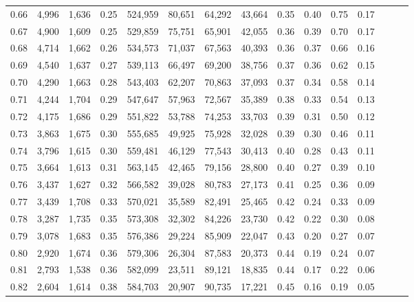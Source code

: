 \begin{tabular}{rrrrrrrrrrrrrrr}
0.66 &   4,996 &  1,636 &  0.25 &  524,959 &   80,651 &   64,292 &   43,664 &  0.35 &  0.40 &  0.75 &      0.17 \\
0.67 &   4,900 &  1,609 &  0.25 &  529,859 &   75,751 &   65,901 &   42,055 &  0.36 &  0.39 &  0.70 &      0.17 \\
0.68 &   4,714 &  1,662 &  0.26 &  534,573 &   71,037 &   67,563 &   40,393 &  0.36 &  0.37 &  0.66 &      0.16 \\
0.69 &   4,540 &  1,637 &  0.27 &  539,113 &   66,497 &   69,200 &   38,756 &  0.37 &  0.36 &  0.62 &      0.15 \\
0.70 &   4,290 &  1,663 &  0.28 &  543,403 &   62,207 &   70,863 &   37,093 &  0.37 &  0.34 &  0.58 &      0.14 \\
0.71 &   4,244 &  1,704 &  0.29 &  547,647 &   57,963 &   72,567 &   35,389 &  0.38 &  0.33 &  0.54 &      0.13 \\
0.72 &   4,175 &  1,686 &  0.29 &  551,822 &   53,788 &   74,253 &   33,703 &  0.39 &  0.31 &  0.50 &      0.12 \\
0.73 &   3,863 &  1,675 &  0.30 &  555,685 &   49,925 &   75,928 &   32,028 &  0.39 &  0.30 &  0.46 &      0.11 \\
0.74 &   3,796 &  1,615 &  0.30 &  559,481 &   46,129 &   77,543 &   30,413 &  0.40 &  0.28 &  0.43 &      0.11 \\
0.75 &   3,664 &  1,613 &  0.31 &  563,145 &   42,465 &   79,156 &   28,800 &  0.40 &  0.27 &  0.39 &      0.10 \\
0.76 &   3,437 &  1,627 &  0.32 &  566,582 &   39,028 &   80,783 &   27,173 &  0.41 &  0.25 &  0.36 &      0.09 \\
0.77 &   3,439 &  1,708 &  0.33 &  570,021 &   35,589 &   82,491 &   25,465 &  0.42 &  0.24 &  0.33 &      0.09 \\
0.78 &   3,287 &  1,735 &  0.35 &  573,308 &   32,302 &   84,226 &   23,730 &  0.42 &  0.22 &  0.30 &      0.08 \\
0.79 &   3,078 &  1,683 &  0.35 &  576,386 &   29,224 &   85,909 &   22,047 &  0.43 &  0.20 &  0.27 &      0.07 \\
0.80 &   2,920 &  1,674 &  0.36 &  579,306 &   26,304 &   87,583 &   20,373 &  0.44 &  0.19 &  0.24 &      0.07 \\
0.81 &   2,793 &  1,538 &  0.36 &  582,099 &   23,511 &   89,121 &   18,835 &  0.44 &  0.17 &  0.22 &      0.06 \\
0.82 &   2,604 &  1,614 &  0.38 &  584,703 &   20,907 &   90,735 &   17,221 &  0.45 &  0.16 &  0.19 &      0.05 \\

\end{tabular}
